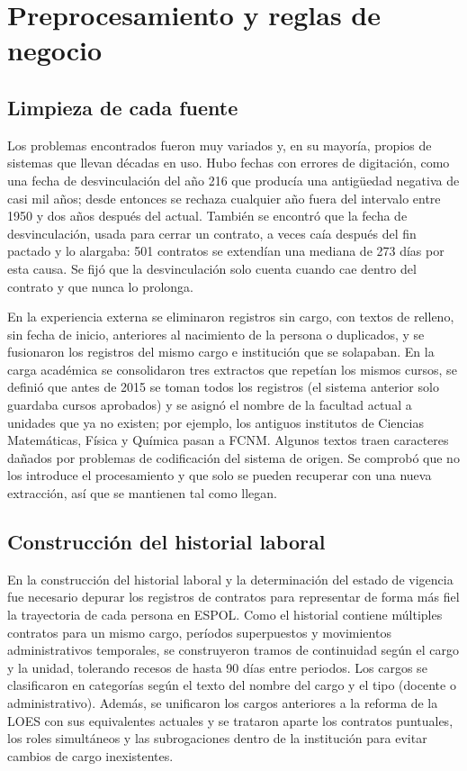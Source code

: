 \section{Preprocesamiento y reglas de negocio}
\label{sec:met_preprocesamiento}

\subsection{Limpieza de cada fuente}

Los problemas encontrados fueron muy variados y, en su mayoría, propios de sistemas que llevan décadas en uso. Hubo fechas con errores de digitación, como una fecha de desvinculación del año 216 que producía una antigüedad negativa de casi mil años; desde entonces se rechaza cualquier año fuera del intervalo entre 1950 y dos años después del actual. También se encontró que la fecha de desvinculación, usada para cerrar un contrato, a veces caía después del fin pactado y lo alargaba: 501 contratos se extendían una mediana de 273 días por esta causa. Se fijó que la desvinculación solo cuenta cuando cae dentro del contrato y que nunca lo prolonga.

En la experiencia externa se eliminaron registros sin cargo, con textos de relleno, sin fecha de inicio, anteriores al nacimiento de la persona o duplicados, y se fusionaron los registros del mismo cargo e institución que se solapaban. En la carga académica se consolidaron tres extractos que repetían los mismos cursos, se definió que antes de 2015 se toman todos los registros (el sistema anterior solo guardaba cursos aprobados) y se asignó el nombre de la facultad actual a unidades que ya no existen; por ejemplo, los antiguos institutos de Ciencias Matemáticas, Física y Química pasan a FCNM. Algunos textos traen caracteres dañados por problemas de codificación del sistema de origen. Se comprobó que no los introduce el procesamiento y que solo se pueden recuperar con una nueva extracción, así que se mantienen tal como llegan.

\subsection{Construcción del historial laboral}

En la construcción del historial laboral y la determinación del estado de vigencia fue necesario depurar los registros de contratos para representar de forma más fiel la trayectoria de cada persona en ESPOL. Como el historial contiene múltiples contratos para un mismo cargo, períodos superpuestos y movimientos administrativos temporales, se construyeron tramos de continuidad según el cargo y la unidad, tolerando recesos de hasta 90 días entre periodos. Los cargos se clasificaron en categorías según el texto del nombre del cargo y el tipo (docente o administrativo). Además, se unificaron los cargos anteriores a la reforma de la LOES con sus equivalentes actuales y se trataron aparte los contratos puntuales, los roles simultáneos y las subrogaciones dentro de la institución para evitar cambios de cargo inexistentes.

